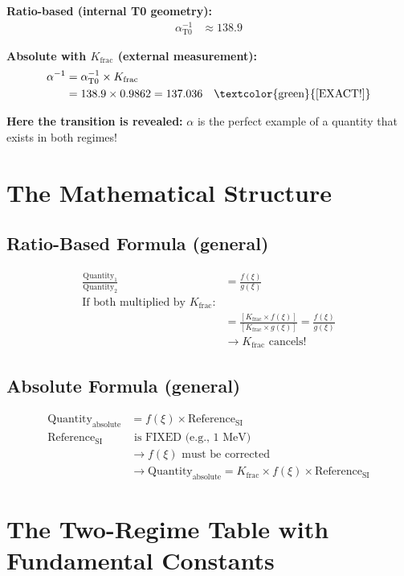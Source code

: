 	\textbf{Ratio-based (internal T0 geometry):}
	\begin{align*}
		\alpha_{\text{T0}}^{-1} &\approx 138.9
	\end{align*}
	
	\textbf{Absolute with $K_{\text{frac}}$ (external measurement):}
	\begin{align*}
		\alpha^{-1} &= \alpha_{\text{T0}}^{-1} \times K_{\text{frac}} \\
		&= 138.9 \times 0.9862 = 137.036 \quad \text{\textcolor{green}{[EXACT!]}}
	\end{align*}
	
	\textbf{Here the transition is revealed:} $\alpha$ is the perfect example of a quantity that exists in both regimes!
	
	\section{The Mathematical Structure}
	
	\subsection{Ratio-Based Formula (general)}
	\begin{align*}
		\frac{\text{Quantity}_1}{\text{Quantity}_2} &= \frac{f(\xi)}{g(\xi)} \\
		\text{If both multiplied by $K_{\text{frac}}$:} & \\
		&= \frac{[K_{\text{frac}} \times f(\xi)]}{[K_{\text{frac}} \times g(\xi)]} = \frac{f(\xi)}{g(\xi)} \\
		&\rightarrow K_{\text{frac}} \text{ cancels!}
	\end{align*}
	
	\subsection{Absolute Formula (general)}
	\begin{align*}
		\text{Quantity}_{\text{absolute}} &= f(\xi) \times \text{Reference}_{\text{SI}} \\
		\text{Reference}_{\text{SI}} &\text{ is FIXED (e.g., 1 MeV)} \\
		&\rightarrow f(\xi) \text{ must be corrected} \\
		&\rightarrow \text{Quantity}_{\text{absolute}} = K_{\text{frac}} \times f(\xi) \times \text{Reference}_{\text{SI}}
	\end{align*}
	
	\section{The Two-Regime Table with Fundamental Constants}
	
